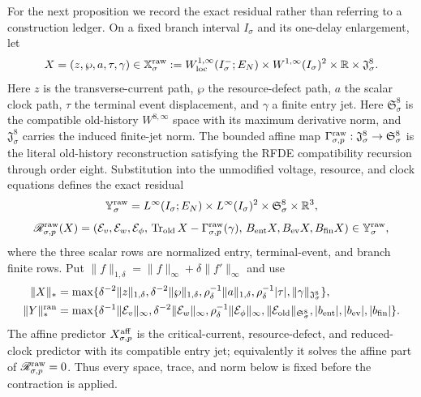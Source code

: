 For the next proposition we record the exact residual rather than referring
to a construction ledger.  On a fixed branch interval \(I_\sigma\) and its
one-delay enlargement, let
\[
 X=(z,\wp,a,\tau,\gamma)\in\mathbb X_\sigma^{\rm raw}
 :=W_{\rm loc}^{1,\infty}(I_\sigma^-;E_N)
   \times W^{1,\infty}(I_\sigma)^2\times\mathbb R
   \times\mathfrak J_\sigma^8 .
\]
Here \(z\) is the transverse-current path, \(\wp\) the resource-defect path,
\(a\) the scalar clock path, \(\tau\) the terminal event displacement, and
\(\gamma\) a finite entry jet.  Here \(\mathfrak S_\sigma^8\) is the
compatible old-history \(W^{8,\infty}\) space with its maximum derivative
norm, and \(\mathfrak J_\sigma^8\) carries the induced finite-jet norm.
The bounded affine map
\(\Gamma_{\sigma,p}^{\rm raw}:\mathfrak J_\sigma^8\to\mathfrak S_\sigma^8\)
is the literal old-history reconstruction satisfying the RFDE compatibility
recursion through order eight.  Substitution into the unmodified voltage,
resource, and clock equations defines the exact residual
\[
 \mathbb Y_\sigma^{\rm raw}
 =L^\infty(I_\sigma;E_N)\times L^\infty(I_\sigma)^2
  \times\mathfrak S_\sigma^8\times\mathbb R^3,
\]
\begin{equation}
 \mathscr R_{\sigma,p}^{\rm raw}(X)
 =(\mathcal E_v,\mathcal E_w,\mathcal E_\phi,\,
   \operatorname{Tr}_{\rm old}X-\Gamma_{\sigma,p}^{\rm raw}(\gamma),\,
   B_{\rm ent}X,B_{\rm ev}X,B_{\rm fin}X)
 \in\mathbb Y_\sigma^{\rm raw},                       \label{eq:anchor-toolkit-raw-residual}
\end{equation}
where the three scalar rows are normalized entry, terminal-event, and
branch finite rows.  Put
\(\|f\|_{1,\delta}=\|f\|_\infty+\delta\|f'\|_\infty\) and use
\begin{align*}
 \|X\|_*&=\max\{\delta^{-2}\|z\|_{1,\delta},
   \delta^{-2}\|\wp\|_{1,\delta},
   \rho_\delta^{-1}\|a\|_{1,\delta},
   \rho_\delta^{-1}|\tau|,\|\gamma\|_{\mathfrak J_\sigma^8}\},\\
 \|Y\|_*^{\rm ran}&=\max\{\delta^{-1}\|\mathcal E_v\|_\infty,
   \delta^{-2}\|\mathcal E_w\|_\infty,
   \rho_\delta^{-1}\|\mathcal E_\phi\|_\infty,
   \|\mathcal E_{\rm old}\|_{\mathfrak S_\sigma^8},
   |b_{\rm ent}|,|b_{\rm ev}|,|b_{\rm fin}|\}.
\end{align*}
The affine predictor \(X_{\sigma,p}^{\rm aff}\) is the critical-current,
resource-defect, and reduced-clock predictor with its compatible entry jet;
equivalently it solves the affine part of
\(\mathscr R_{\sigma,p}^{\rm raw}=0\).  Thus every space, trace, and norm
below is fixed before the contraction is applied.

